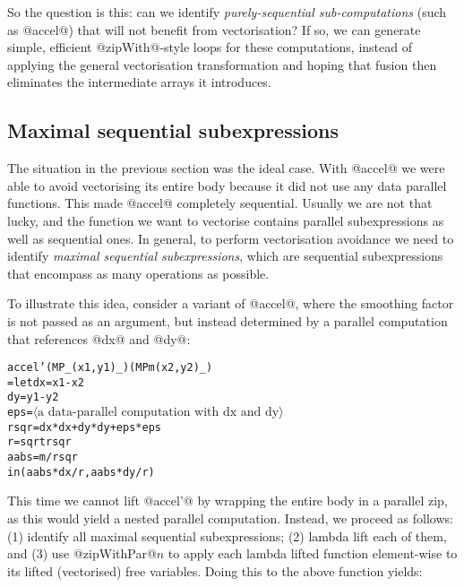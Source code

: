 \eject
So the question is this: can we identify \emph{purely-sequential sub-computations} (such as @accel@) that will not benefit from vectorisation?  If so, we can generate simple, efficient @zipWith@-style loops for these computations, instead of applying the general vectorisation transformation and hoping that fusion then eliminates the intermediate arrays it introduces. 


\subsection{Maximal sequential subexpressions}
\label{sec:maximal-seq}

The situation in the previous section was the ideal case. With @accel@ we were able to avoid vectorising its entire body because it did not use any data parallel functions. This made @accel@ completely sequential. Usually we are not that lucky, and the function we want to vectorise contains parallel subexpressions as well as sequential ones. In general, to perform vectorisation avoidance we need to identify \emph{maximal sequential subexpressions}, which are sequential subexpressions that encompass as many operations as possible.

To illustrate this idea, consider a variant of @accel@, where the smoothing factor is not passed as an argument, but instead determined by a parallel computation that references @dx@ and @dy@:
%
\begin{small}
\begin{alltt}
  accel' (MP _ (x1, y1) _) (MP m (x2, y2) _)
   = let dx   = x1 - x2 
         dy   = y1 - y2 
         eps  = \(\langle\textrm{a data-parallel computation with dx and dy}\rangle\)
         rsqr = dx * dx + dy * dy + eps * eps
         r    = sqrt rsqr 
         aabs = m / rsqr 
     in  (aabs * dx / r , aabs * dy / r)
\end{alltt}
\end{small}

This time we cannot lift @accel'@ by wrapping the entire body in a parallel zip, as this would yield a nested parallel computation. Instead, we proceed as follows: (1) identify all maximal sequential subexpressions; (2) lambda lift each of them, and (3) use @zipWithPar@$n$ to apply each lambda lifted function element-wise to its lifted (vectorised) free variables. Doing this to the above function yields:

